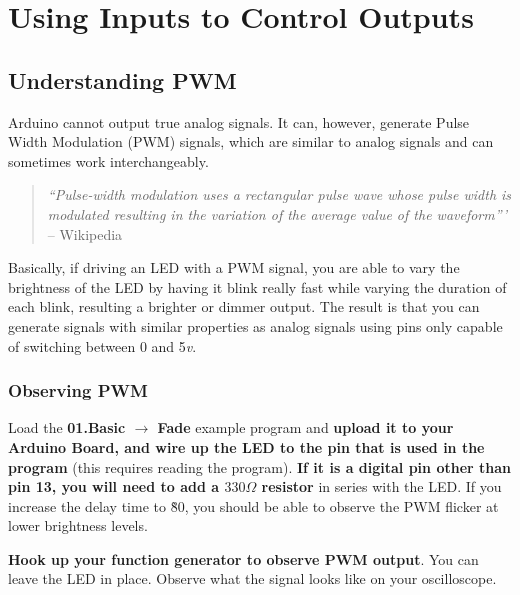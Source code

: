 \documentclass[11pt,a4paper]{article}
\begin{document}



\section{Using Inputs to Control Outputs} %
\label{sec:using_inputs_to_control_outputs}

\subsection{Understanding PWM} %
\label{sub:understanding_pwm}

Arduino cannot output true analog signals.  It can, however, generate Pulse Width Modulation (PWM) signals, which are similar to analog signals and can sometimes work interchangeably.  

\begin{quote}
\emph{``Pulse-width modulation uses a rectangular pulse wave whose pulse width is modulated resulting in the variation of the average value of the waveform'''} -- Wikipedia\cite{pwm}
\end{quote}

Basically, if driving an LED with a PWM signal, you are able to vary the brightness of the LED by having it blink really fast while varying the duration of each blink, resulting a brighter or dimmer output.  The result is that you can generate signals with similar properties as analog signals using pins only capable of switching between 0 and 5\emph{v}.

\subsubsection{Observing PWM} %
\label{sub:observing_pwm}

Load the \textbf{01.Basic $\rightarrow$ Fade} example program and \textbf{upload it to your Arduino Board, and wire up the LED to the pin that is used in the program} (this requires reading the program).  \textbf{If it is a digital pin other than pin 13, you will need to add a $330\Omega$ resistor} in series with the LED.  If you increase the delay time to \~80, you should be able to observe the PWM flicker at lower brightness levels.  

\textbf{Hook up your function generator to observe PWM output}.  You can leave the LED in place.  Observe what the signal looks like on your oscilloscope. 
\end{document}
